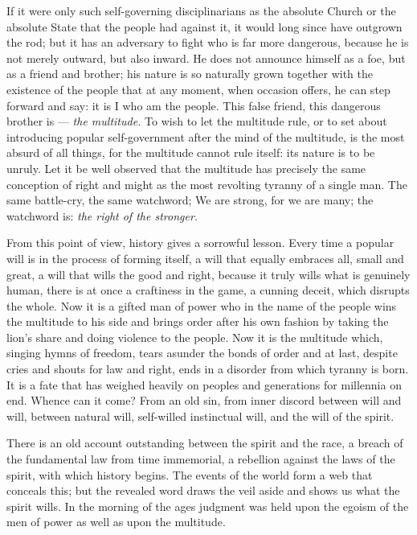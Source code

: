 \documentclass[12pt,a4paper,openany]{book}
\newcommand{\opage}[1]{\marginnote{\footnotesize\textit{[#1]}}}
\begin{document}
If it were only such self-governing disciplinarians
as the absolute Church or the absolute
State that the people had against it, it would long since have
outgrown the rod; but it has an adversary to fight
who is far more dangerous, because he is not merely
outward, but also inward. He does not announce himself
as a foe, but as a friend and brother; his nature is
so naturally grown together with the existence of the people that
at any moment, when occasion offers, he can step forward and
say: it is I who am the people. This false friend,
this dangerous brother is --- \emph{the multitude.} To wish to let
the multitude rule, or to set about introducing popular
self-government after the mind of the multitude, is the most absurd
of all things, for the multitude cannot rule itself: its
nature is to be unruly. Let it be well observed
that the multitude has precisely the same conception of right
and might as the most revolting tyranny of a single man.
The same battle-cry, the same watchword; We are strong, for we
are many; the watchword is: \emph{the right of the stronger.}

From this point of view, history gives a sorrowful
lesson. Every time a popular will is in
\setcounter{footnote}{0}%
\opage{9}the process of forming itself, a will that equally embraces
all, small and great, a will that wills the good and
right, because it truly wills what is genuinely human,
there is at once a craftiness in the game, a
cunning deceit, which disrupts the whole. Now it is
a gifted man of power who in the name of the people wins the multitude
to his side and brings order after his own fashion by
taking the lion's share and doing violence to the people. Now it is
the multitude which, singing hymns of freedom,
tears asunder the bonds of order and at last, despite cries and
shouts for law and right, ends in a disorder from which
tyranny is born. It is a fate that has weighed heavily on peoples
and generations for millennia on end. Whence
can it come? From an old sin, from inner
discord between will and will, between natural will, self-willed
instinctual will, and the will of the spirit.

There is an old account outstanding between the spirit
and the race, a breach of the fundamental law from time immemorial, a rebellion
against the laws of the spirit, with which history begins.
The events of the world form a web that conceals this;
but the revealed word draws the veil aside
and shows us what the spirit wills. In the morning of the ages
judgment was held upon the egoism of the men of power as well as
upon the multitude.
\end{document}
